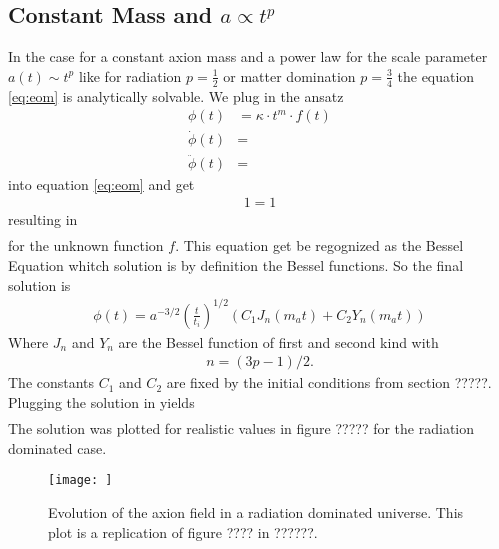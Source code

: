 \documentclass[a4paper]{article}
\begin{document}
\subsection{Constant Mass and $a \propto t^p$}
In the case for a constant axion mass and
a power law for the scale parameter $a(t) \sim t^p$ like for radiation $p = \frac{1}{2}$
or matter domination $p = \frac{3}{4}$
the equation \ref{eq:eom} is analytically solvable.
We plug in the ansatz
\begin{align*}
    \phi(t) &= \kappa \cdot t^m \cdot f(t) \\
    \dot{\phi}(t) &= \\
    \ddot{\phi}(t) &=
\end{align*}
into equation \ref{eq:eom} and get
\begin{align*}
1 = 1
\end{align*}
resulting in
\begin{align*}
\end{align*}
for the unknown function $f$.
This equation get be regognized as the Bessel Equation whitch solution is by definition
the Bessel functions.
So the final solution is
\begin{align}
    \label{eq:power_law_solution}
    \phi(t) = a^{-3/2} \left(\frac{t}{t_i}\right)^{1/2}\left(C_1 J_n(m_a t) + C_2 Y_n(m_a t)\right)
\end{align}
Where $J_n$ and $Y_n$ are the Bessel function of first and second kind with
\begin{align}
    n = (3p - 1) / 2.
\end{align}
The constants $C_1$ and $C_2$ are fixed by the initial conditions from section ?????.
Plugging the solution in yields
\begin{align*}
\end{align*}
The solution was plotted for realistic values in figure ????? for the radiation dominated case.
\begin{figure}
    \centering
    \texttt{[image: ]}
    \caption{Evolution of the axion field in a radiation dominated universe. This plot is a replication of figure ???? in ??????.}
    \label{fig:rad_dom_ax_field}
\end{figure}
\end{document}
